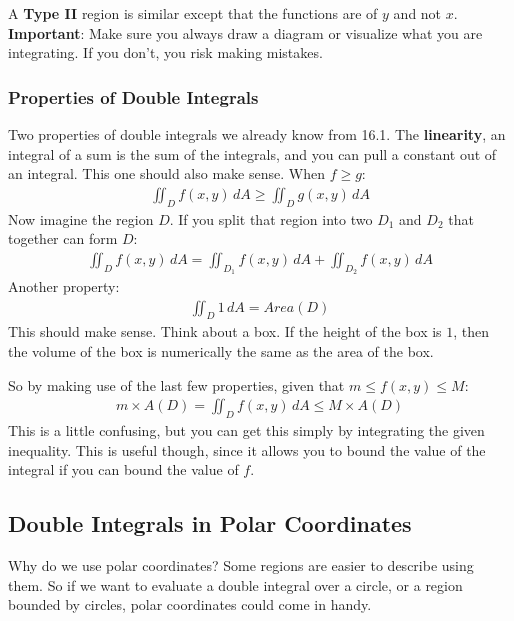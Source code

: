 \documentclass{article}
\begin{document}
A \textbf{Type II} region is similar except that the functions are of $y$ and not $x$.
\textbf{Important}: Make sure you always draw a diagram or visualize what you are integrating. If you don't, you risk making mistakes.
\subsubsection{Properties of Double Integrals}
Two properties of double integrals we already know from 16.1. The \textbf{linearity}, an integral of a sum is the sum of the integrals, and you can pull a constant out of an integral. This one should also make sense. When $f \geqslant g$:
\begin{gather*}
    \iint_D f(x,y) \,dA \geqslant \iint_D g(x,y) \,dA
\end{gather*}
Now imagine the region $D$. If you split that region into two $D_1$ and $D_2$ that together can form $D$:
\begin{gather*}
    \iint_D f(x,y) \,dA = \iint_{D_1} f(x,y) \,dA + \iint_{D_2} f(x,y) \,dA
\end{gather*}
Another property:
\begin{gather*}
    \iint_D 1 \,dA = Area(D)
\end{gather*}
This should make sense. Think about a box. If the height of the box is $1$, then the volume of the box is numerically the same as the area of the box.

So by making use of the last few properties, given that $m \leqslant f(x,y) \leqslant M$:
\begin{gather*}
    m\times A(D) = \iint_D f(x,y) \,dA \leqslant M\times A(D)
\end{gather*}
This is a little confusing, but you can get this simply by integrating the given inequality. This is useful though, since it allows you to bound the value of the integral if you can bound the value of $f$.
\subsection{Double Integrals in Polar Coordinates}
Why do we use polar coordinates? Some regions are easier to describe using them. So if we want to evaluate a double integral over a circle, or a region bounded by circles, polar coordinates could come in handy.
\end{document}
